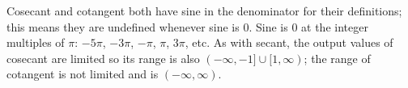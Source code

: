 Cosecant and cotangent both have sine in the denominator for their definitions; this means they are undefined whenever sine is 0. Sine is 0 at the integer multiples of $\pi$: $-5\pi$, $-3\pi$, $-\pi$, $\pi$, $3\pi$, etc. As with secant, the output values of cosecant are limited so its range is also $(-\infty,-1] \cup [1,\infty)$; the range of cotangent is not limited and is $(-\infty,\infty)$.






